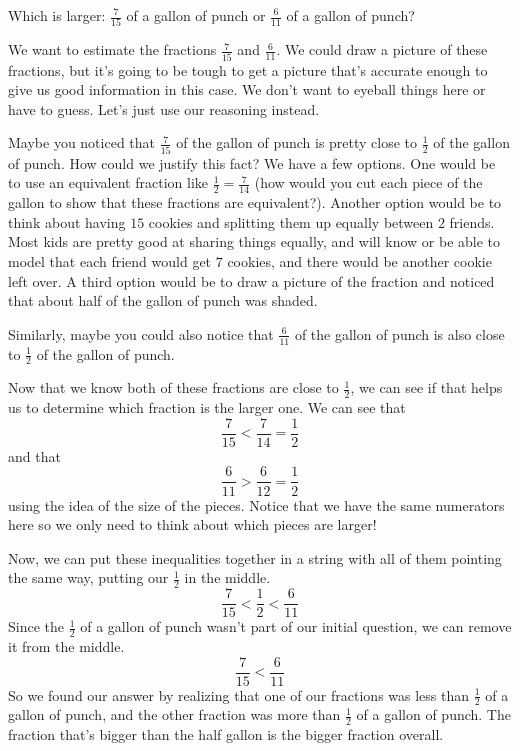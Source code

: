 \documentclass{ximera}
\begin{document}
\begin{question}
Which is larger: $\frac{7}{15}$ of a gallon of punch or $\frac{6}{11}$ of a gallon of punch?

\begin{explanation}

We want to estimate the fractions $\frac{7}{15}$ and $\frac{6}{11}$. We could draw a picture of these fractions, but it's going to be tough to get a picture that's accurate enough to give us good information in this case. We don't want to eyeball things here or have to guess. Let's just use our reasoning instead.

Maybe you noticed that $\frac{7}{15}$ of the gallon of punch is pretty close to $\frac{1}{2}$ of the gallon of punch. How could we justify this fact? We have a few options. One would be to use an equivalent fraction like $\frac{1}{2} = \frac{7}{14}$ (how would you cut each piece of the gallon to show that these fractions are equivalent?). Another option would be to think about having $15$ cookies and splitting them up equally between $2$ friends. Most kids are pretty good at sharing things equally, and will know or be able to model that each friend would get $7$ cookies, and there would be another cookie left over. A third option would be to draw a picture of the fraction and noticed that about half of the gallon of punch was shaded.

Similarly, maybe you could also notice that $\frac{6}{11}$ of the gallon of punch is also close to $\frac{1}{2}$ of the gallon of punch.

Now that we know both of these fractions are close to $\frac{1}{2}$, we can see if that helps us to determine which fraction is the larger one. We can see that
\[
\frac{7}{15} < \frac{7}{14} = \frac{1}{2}
\]
and that 
\[
\frac{6}{11} > \frac{6}{12} = \frac{1}{2}
\]
using the idea of the size of the pieces. Notice that we have the same numerators here so we only need to think about which pieces are larger!

Now, we can put these inequalities together in a string with all of them pointing the same way, putting our $\frac{1}{2}$ in the middle.
\[
\frac{7}{15} < \frac{1}{2} < \frac{6}{11}
\]
Since the $\frac{1}{2}$ of a gallon of punch wasn't part of our initial question, we can remove it from the middle.
\[
\frac{7}{15} < \frac{6}{11}
\]
So we found our answer by realizing that one of our fractions was less than $\frac{1}{2}$ of a gallon of punch, and the other fraction was more than $\frac{1}{2}$ of a gallon of punch. The fraction that's bigger than the half gallon is the bigger fraction overall.


\end{explanation}
\end{question}
\end{document}
